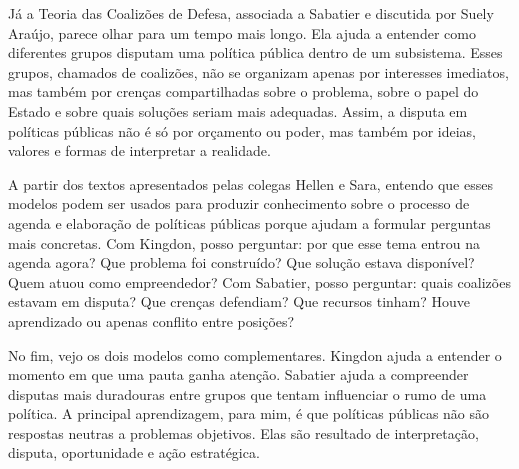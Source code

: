 \documentclass[12pt,a4paper]{article}
\begin{document}
Já a Teoria das Coalizões de Defesa, associada a Sabatier e discutida por Suely Araújo, parece olhar para um tempo mais longo. Ela ajuda a entender como diferentes grupos disputam uma política pública dentro de um subsistema. Esses grupos, chamados de coalizões, não se organizam apenas por interesses imediatos, mas também por crenças compartilhadas sobre o problema, sobre o papel do Estado e sobre quais soluções seriam mais adequadas. Assim, a disputa em políticas públicas não é só por orçamento ou poder, mas também por ideias, valores e formas de interpretar a realidade.

A partir dos textos apresentados pelas colegas Hellen e Sara, entendo que esses modelos podem ser usados para produzir conhecimento sobre o processo de agenda e elaboração de políticas públicas porque ajudam a formular perguntas mais concretas. Com Kingdon, posso perguntar: por que esse tema entrou na agenda agora? Que problema foi construído? Que solução estava disponível? Quem atuou como empreendedor? Com Sabatier, posso perguntar: quais coalizões estavam em disputa? Que crenças defendiam? Que recursos tinham? Houve aprendizado ou apenas conflito entre posições?

No fim, vejo os dois modelos como complementares. Kingdon ajuda a entender o momento em que uma pauta ganha atenção. Sabatier ajuda a compreender disputas mais duradouras entre grupos que tentam influenciar o rumo de uma política. A principal aprendizagem, para mim, é que políticas públicas não são respostas neutras a problemas objetivos. Elas são resultado de interpretação, disputa, oportunidade e ação estratégica.
\end{document}
